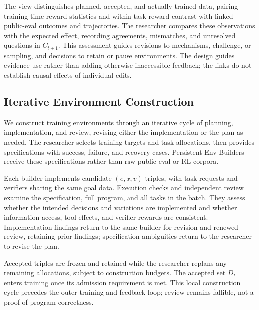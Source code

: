 The view distinguishes planned, accepted, and actually trained data, pairing
training-time reward statistics and within-task reward contrast with linked
public-eval outcomes and trajectories. The researcher compares these observations
with the expected effect, recording agreements, mismatches, and unresolved
questions in $C_{t+1}$. This assessment guides revisions to mechanisms,
challenge, or sampling, and decisions to retain or pause environments. The
design guides evidence use rather than adding otherwise inaccessible feedback;
the links do not establish causal effects of individual edits.

\subsection{Iterative Environment Construction}
\label{sec:environment}

We construct training environments through an iterative cycle of planning,
implementation, and review, revising either the implementation or the plan as
needed. The researcher selects training targets and task allocations, then
provides specifications with success, failure, and recovery
cases. Persistent Env Builders receive these specifications rather than raw
public-eval or RL corpora.

\label{sec:checks}
Each builder implements candidate $(e,x,v)$ triples, with task requests and
verifiers sharing the same goal data. Execution checks and independent review
examine the specification, full program, and all tasks in the batch. They
assess whether the intended decisions and variations are implemented and
whether information access, tool effects, and verifier rewards are consistent.
Implementation findings return to
the same builder for revision and renewed review, retaining prior findings;
specification ambiguities return to the researcher to revise the plan.

Accepted triples are frozen and retained while the researcher replans any
remaining allocations, subject to construction budgets. The accepted set
$D_t$ enters training once its admission requirement is met. This local
construction cycle precedes the outer training and feedback loop; review
remains fallible, not a proof of program correctness.
